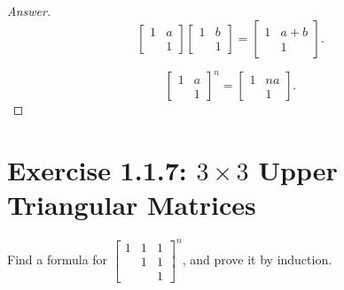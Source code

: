 \documentclass{amsbook}
\theoremstyle{definition}
\theoremstyle{remark}
\numberwithin{section}{chapter}
\numberwithin{equation}{chapter}
\begin{document}
\begin{proof}[Answer]
\[
\begin{bmatrix}
1 &a\\
   &1\end{bmatrix}\begin{bmatrix}
1 &b\\
   &1\end{bmatrix}=\begin{bmatrix}
1 &a+b\\
   &1\end{bmatrix}.
\]

\[
\begin{bmatrix}
1 &a\\
   &1\end{bmatrix}^n=\begin{bmatrix}
1 &na\\
   &1\end{bmatrix}.
\]
\end{proof}

\section{Exercise 1.1.7: $3\times3$ Upper Triangular Matrices}
Find a formula for $\begin{bmatrix}
1&1&1\\
  &1&1\\
  &  &1\end{bmatrix}^n$, and prove it by induction.
\end{document}
